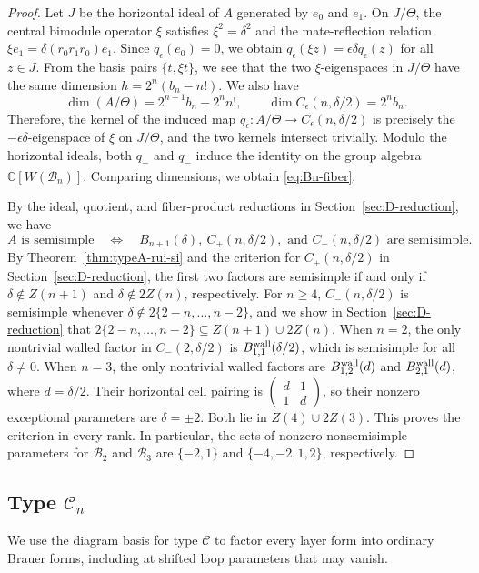 \documentclass[11pt,a4paper]{amsart}
\theoremstyle{uprightdefinition}
\theoremstyle{remark}\newtheorem{remark}[theorem]{Remark}
\begin{document}
\begin{proof}
Let $J$ be the horizontal ideal of $A$ generated by $e_0$ and $e_1$. On $J/\Theta$, the central
bimodule operator $\xi$ satisfies $\xi^2=\delta^2$ and the mate-reflection relation
$\xi e_1=\delta(r_0r_1r_0)e_1$. Since $q_\epsilon(e_0)=0$, we obtain
$q_\epsilon(\xi z)=\epsilon\delta q_\epsilon(z)$ for all $z\in J$.
From the basis pairs $\{t,\xi t\}$, we see that the two $\xi$-eigenspaces in $J/\Theta$ have the same
dimension $h=2^n(b_n-n!)$. We also have
\[
 \dim(A/\Theta)=2^{n+1}b_n-2^n n!,\qquad
 \dim C_\epsilon(n,\delta/2)=2^n b_n.
\]
Therefore, the kernel of the induced map $\bar q_\epsilon: A/\Theta\to C_\epsilon(n,\delta/2)$ is precisely the
$-\epsilon\delta$-eigenspace of $\xi$ on $J/\Theta$, and the two kernels intersect trivially.
Modulo the horizontal ideals, both $q_+$ and $q_-$ induce the identity on the group algebra $\mathbb C[W(\mathscr{B}_n)]$. Comparing dimensions, we obtain \eqref{eq:Bn-fiber}.

By the ideal, quotient, and fiber-product reductions in
Section~\ref{sec:D-reduction}, we have
\[
 A\text{ is semisimple}\quad\Longleftrightarrow\quad
 B_{n+1}(\delta),\ C_+(n,\delta/2),\text{ and }C_-(n,\delta/2)
 \text{ are semisimple}.
\]
By Theorem~\ref{thm:typeA-rui-si} and the criterion for $C_+(n,\delta/2)$ in Section~\ref{sec:D-reduction}, the first two factors are semisimple if and only if
$\delta\notin Z(n+1)$ and $\delta\notin2Z(n)$, respectively.
For $n\ge4$, $C_-(n,\delta/2)$ is semisimple whenever
$\delta\notin2\{2-n,\ldots,n-2\}$, and we show in
Section~\ref{sec:D-reduction} that $2\{2-n,\ldots,n-2\}\subseteq Z(n+1)\cup2Z(n)$.
When $n=2$, the only nontrivial walled
factor in $C_-(2,\delta/2)$ is $B^{\rm wall}_{1,1}(\delta/2)$, which is semisimple for all
$\delta\ne0$. When $n=3$, the only nontrivial walled factors are
$B^{\rm wall}_{1,2}(d)$ and $B^{\rm wall}_{2,1}(d)$, where $d=\delta/2$.
Their horizontal cell pairing is
$\left(\begin{smallmatrix}d&1\\1&d\end{smallmatrix}\right)$,
so their nonzero exceptional parameters are $\delta=\pm2$.
Both lie in $Z(4)\cup2Z(3)$. This proves the criterion in every rank. In particular, the sets of nonzero nonsemisimple parameters for
$\mathscr{B}_2$ and $\mathscr{B}_3$ are $\{-2,1\}$ and
$\{-4,-2,1,2\}$, respectively.
\end{proof}



\subsection{Type \texorpdfstring{$\mathscr{C}_n$}{Cn}}
\label{subsec:type-C}
\label{sec:definitions}
\label{sec:gram}
We use the diagram basis for type $\mathscr{C}$ to factor every layer form
into ordinary Brauer forms, including at shifted loop parameters that may vanish.
\end{document}
